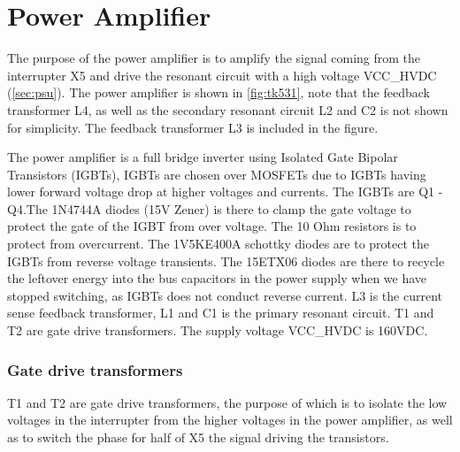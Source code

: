 

\newpage
\section{Power Amplifier}
\label{sec:pa}

The purpose of the power amplifier is to amplify the signal coming from the interrupter X5 and drive the resonant circuit with a high voltage VCC\_HVDC (\cref{sec:psu}). The power amplifier is shown in \cref{fig:tk531}, note that the feedback transformer L4, as well as the secondary resonant circuit L2 and C2 is not shown for simplicity. The feedback transformer L3 is included in the figure.

The power amplifier is a full bridge inverter using Isolated Gate Bipolar Transistors (IGBTs), IGBTs are chosen over MOSFETs due to IGBTs having lower forward voltage drop at higher voltages and currents. The IGBTs are Q1 - Q4.The 1N4744A diodes (15V Zener) is there to clamp the gate voltage to protect the gate of the IGBT from over voltage. The 10 Ohm resistors is to protect from overcurrent. The 1V5KE400A schottky diodes are to protect the IGBTs from reverse voltage transients. The 15ETX06 diodes are there to recycle the leftover energy into the bus capacitors in the power supply when we have stopped switching, as IGBTs does not conduct reverse current. L3 is the current sense feedback transformer, L1 and C1 is the primary resonant circuit. T1 and T2 are gate drive transformers. The supply voltage VCC\_HVDC is 160VDC.

\subsubsection{Gate drive transformers}
T1 and T2 are gate drive transformers, the purpose of which is to isolate the low voltages in the interrupter from the higher voltages in the power amplifier, as well as to switch the phase for half of X5 the signal driving the transistors.


